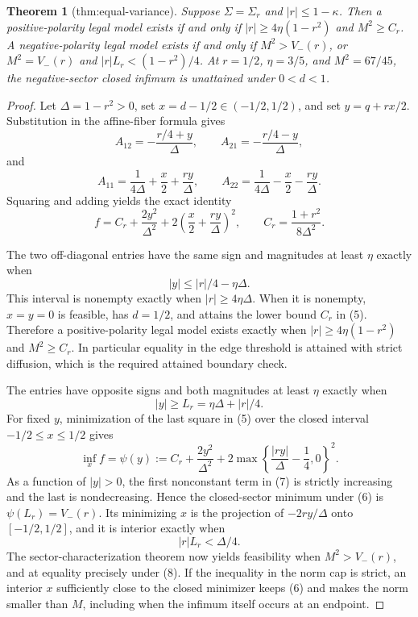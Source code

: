 \documentclass{article}
\newtheorem{theorem}{Theorem}
\begin{document}
\begin{theorem}[thm:equal-variance]\label{thm:equal-variance}
Suppose \(\Sigma=\Sigma_r\) and \(|r|\le1-\kappa\). Then a positive-polarity legal model exists if and only if \(|r|\ge4\eta(1-r^2)\) and \(M^2\ge C_r\). A negative-polarity legal model exists if and only if \(M^2>V_-(r)\), or \(M^2=V_-(r)\) and \(|r|L_r<(1-r^2)/4\). At \(r=1/2\), \(\eta=3/5\), and \(M^2=67/45\), the negative-sector closed infimum is unattained under \(0<d<1\).
\end{theorem}
\begin{proof}
Let \(\Delta=1-r^2>0\), set \(x=d-1/2\in(-1/2,1/2)\), and set \(y=q+rx/2\).  Substitution in the affine-fiber formula gives
\[
 A_{12}=-\frac{r/4+y}{\Delta},\qquad
 A_{21}=-\frac{r/4-y}{\Delta},
\]
and
\[
 A_{11}=\frac1{4\Delta}+\frac x2+\frac{ry}{\Delta},\qquad
 A_{22}=\frac1{4\Delta}-\frac x2-\frac{ry}{\Delta}.
\]
Squaring and adding yields the exact identity
\[
 f=C_r+\frac{2y^2}{\Delta^2}
 +2\left(\frac x2+\frac{ry}{\Delta}\right)^2,\qquad
 C_r=\frac{1+r^2}{8\Delta^2}. \tag{5}
\]

The two off-diagonal entries have the same sign and magnitudes at least \(\eta\) exactly when
\[
 |y|\le |r|/4-\eta\Delta.
\]
This interval is nonempty exactly when \(|r|\ge4\eta\Delta\).  When it is nonempty, \(x=y=0\) is feasible, has \(d=1/2\), and attains the lower bound \(C_r\) in (5).  Therefore a positive-polarity legal model exists exactly when \(|r|\ge4\eta(1-r^2)\) and \(M^2\ge C_r\).  In particular equality in the edge threshold is attained with strict diffusion, which is the required attained boundary check.

The entries have opposite signs and both magnitudes at least \(\eta\) exactly when
\[
 |y|\ge L_r=\eta\Delta+|r|/4. \tag{6}
\]
For fixed \(y\), minimization of the last square in (5) over the closed interval \(-1/2\le x\le1/2\) gives
\[
 \inf_x f
 =\psi(y):=C_r+\frac{2y^2}{\Delta^2}
 +2\max\left\{\frac{|ry|}{\Delta}-\frac14,0\right\}^2. \tag{7}
\]
As a function of \(|y|>0\), the first nonconstant term in (7) is strictly increasing and the last is nondecreasing.  Hence the closed-sector minimum under (6) is \(\psi(L_r)=V_-(r)\).  Its minimizing \(x\) is the projection of \(-2ry/\Delta\) onto \([-1/2,1/2]\), and it is interior exactly when
\[
 |r|L_r<\Delta/4. \tag{8}
\]
The sector-characterization theorem now yields feasibility when \(M^2>V_-(r)\), and at equality precisely under (8).  If the inequality in the norm cap is strict, an interior \(x\) sufficiently close to the closed minimizer keeps (6) and makes the norm smaller than \(M\), including when the infimum itself occurs at an endpoint.


\end{proof}
\end{document}
